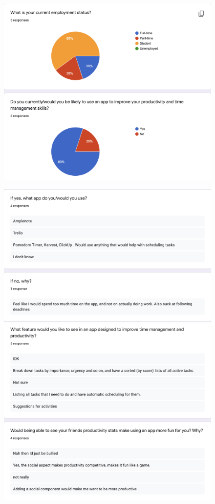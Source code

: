 \begin{figure}[H]
	\centering
	\includegraphics[width=12cm]{./graphics/questionnaire1.png}
\end{figure}

\begin{figure}[H]
    \centering
    \includegraphics[width=12cm]{./graphics/questionnaire2.png}
	\includegraphics[width=12cm]{./graphics/questionnaire3.png}
\end{figure}

